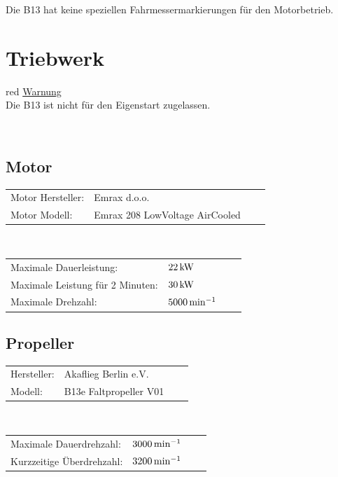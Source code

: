 \vspace{0.2cm}
Die B13 hat keine speziellen Fahrmessermarkierungen für den Motorbetrieb.
\newpage
\section{Triebwerk}
\begin{color}{red}
\large{\underline{Warnung}}\\
Die B13 ist nicht für den Eigenstart zugelassen.
\end{color}\\

\subsection{Motor}
\begin{tabular}{p{}p{}ll}
Motor Hersteller: & Emrax d.o.o.\\
Motor Modell: & Emrax 208 LowVoltage AirCooled\\
\end{tabular}\\

\vspace{0.2cm}
\begin{tabular}{p{}p{}ll}
Maximale Dauerleistung: & $\unit[22]{kW}$\\
Maximale Leistung für 2 Minuten: & $\unit[30]{kW}$\\
Maximale Drehzahl: & $\unit[5000]{min^{-1}}$
\end{tabular}

\subsection{Propeller}
\begin{tabular}{p{}p{}ll}
Hersteller: & Akaflieg Berlin e.V. \\
Modell: & B13e Faltpropeller V01 \\
\end{tabular}\\

\vspace{0.2cm}
\begin{tabular}{p{}p{}ll}
Maximale Dauerdrehzahl: & $\unit[3000]{min^{-1}}$ \\
Kurzzeitige Überdrehzahl: & $\unit[3200]{min^{-1}}$ \\
\end{tabular}

